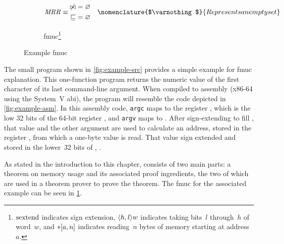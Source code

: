 \begin{figure*}
\begin{subfigure}{\linewidth}
\begin{subequations}
\begin{align}
        \var{MRR} &\equiv\begin{aligned}
          \not\bowtie &= \varnothing \\
          \sqsubseteq &= \varnothing
        \end{aligned} \notag
      \end{align}%
      \nomenclature{$\varnothing$}{Represents an empty set}
    \end{subequations}
    \caption{\Acl*{fmuc}\footnote{%
      $\operatorname{sextend}$ indicates sign extension,
      $\langle h,l\rangle w$ indicates taking bits~$l$ through~$h$ of word~$w$,
      and $\ast[a,n]$ indicates reading~$n$ bytes of memory
      starting at address~$a$.
    }}\label{fig:fmuc-thm}
  \end{subfigure}
  \caption{Example \acl*{fmuc}}\label{fig:fmuc}
\end{figure*}

The small program shown in \cref{fig:example-src} provides a simple example
for \ac{fmuc} explanation. This one-function program
returns the numeric value of the first character of its last command-line argument.
When compiled to assembly (x86-64 using the System~V \ac{abi}),
the program will resemble the code depicted in \cref{fig:example-asm}.
In this assembly code,
\lstinline|argc| maps to the register ,
which is the low 32 bits of the 64-bit register ,
and \lstinline|argv| maps to .
After sign-extending  to fill ,
that value and the other argument are used to calculate
an address, stored in the register ,
from which a one-byte value is read.
That value sign extended and stored in the lower~32 bits of ,
.

As stated in the introduction to this chapter,  consists of two main parts:
a theorem on memory usage and its associated proof ingredients,%
%
the two of which are used in a theorem prover to prove the theorem.
The \ac{fmuc} for the associated example can be seen in \cref{fig:fmuc-thm}.

